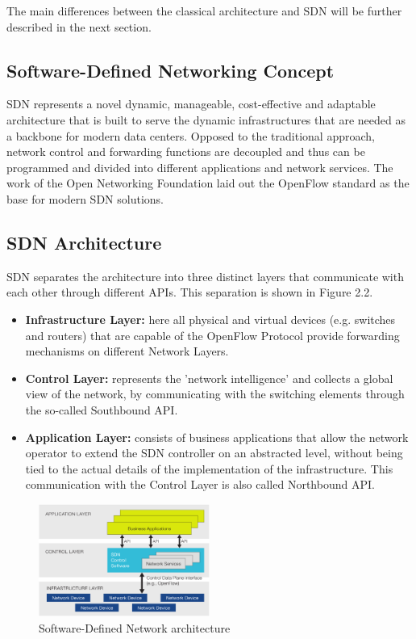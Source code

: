 The main differences between the classical architecture and SDN will be further described in the next section.

\subsection{Software-Defined Networking Concept}

SDN represents a novel dynamic, manageable, cost-effective and adaptable architecture \cite{onfdefinition} that is built to serve the dynamic infrastructures that are needed as a backbone for modern data centers. Opposed to the traditional approach, network control and forwarding functions are decoupled and thus can be programmed and divided into different applications and network services.
The work of the Open Networking Foundation laid out the OpenFlow standard as the base for modern SDN solutions.

\subsection{SDN Architecture}

SDN separates the architecture into three distinct layers that communicate with each other through different APIs. This separation is shown in Figure 2.2.

\begin{itemize}
\item \textbf{Infrastructure Layer:} here all physical and virtual devices (e.g. switches and routers) that are capable of the OpenFlow Protocol provide forwarding mechanisms on different Network Layers.
\item \textbf{Control Layer:} represents the 'network intelligence' and collects a global view of the network, by communicating with the switching elements through the so-called Southbound API.
\item \textbf{Application Layer:} consists of business applications that allow the network operator to extend the SDN controller on an abstracted level, without being tied to the actual details of the implementation of the infrastructure. This communication with the Control Layer is also called Northbound API.
\end{itemize}

\begin{figure}[H]
\centering

\includegraphics[width=0.5\textwidth]{images/fundamentals/sdn_logical_architecture.png}

\caption{Software-Defined Network architecture}
\end{figure}

